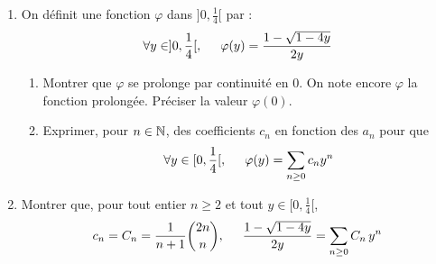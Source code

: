 \begin{enumerate}
\item On définit une fonction $\varphi$ dans $]0,\frac{1}{4}[$ par :
\begin{displaymath}
\forall y \in ]0,\frac{1}{4}[,\hspace{0.5cm}     \varphi(y) =  \frac{1-\sqrt{1-4y}}{2y}
\end{displaymath}
\begin{enumerate}
  \item Montrer que $\varphi$ se prolonge par continuité en $0$. On note encore $\varphi$ la fonction prolongée. Préciser la valeur $\varphi(0)$.
  \item Exprimer, pour $n\in \mathbb{N}$, des coefficients $c_n$ en fonction des $a_n$ pour que
  \begin{displaymath}
\forall y \in [0,\frac{1}{4}[,\hspace{0.5cm}    \varphi(y) = \sum_{n\geq 0} c_ny^n
  \end{displaymath}
\end{enumerate}

\item Montrer que, pour tout entier $n\geq 2$ et tout $y \in [0,\frac{1}{4}[$,
\begin{displaymath}
  c_n = C_n = \frac{1}{n+1}\binom{2n}{n},\hspace{0.5cm}
\frac{1-\sqrt{1-4y}}{2y} = \sum_{n\geq 0} C_n\,y^n
\end{displaymath}

\end{enumerate}



